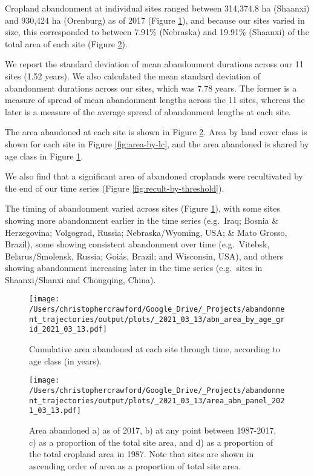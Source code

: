 \documentclass[9pt,twoside,lineno]{pnas-new}
\begin{document}
Cropland abandonment at individual sites ranged between 314,374.8 ha (Shaanxi) and 930,424 ha (Orenburg) as of 2017 (Figure \ref{fig:area-abn-by-age-class}), and because our sites varied in size, this corresponded to between 7.91\% (Nebraska) and 19.91\% (Shaanxi) of the total area of each site (Figure \ref{fig:area-abn-panel}).

We report the standard deviation of mean abandonment durations across our 11 sites (1.52 years).
We also calculated the mean standard deviation of abandonment durations across our sites, which was 7.78 years.
The former is a measure of spread of mean abandonment lengths across the 11 sites, whereas the later is a measure of the average spread of abandonment lengths at each site.

The area abandoned at each site is shown in Figure \ref{fig:area-abn-panel}.
Area by land cover class is shown for each site in Figure \ref{fig:area-by-lc}, and the area abandoned is shared by age class in Figure \ref{fig:area-abn-by-age-class}.

We also find that a significant area of abandoned croplands were recultivated by the end of our time series (Figure \ref{fig:recult-by-threshold}).

The timing of abandonment varied across sites (Figure \ref{fig:area-abn-by-age-class}), with some sites showing more abandonment earlier in the time series (e.g.~Iraq; Bosnia \& Herzegovina; Volgograd, Russia; Nebraska/Wyoming, USA; \& Mato Grosso, Brazil), some showing consistent abandonment over time (e.g.~Vitebsk, Belarus/Smolensk, Russia; Goiás, Brazil; and Wisconsin, USA), and others showing abandonment increasing later in the time series (e.g.~sites in Shaanxi/Shanxi and Chongqing, China).



\begin{figure}
\centering
\texttt{[image: /Users/christophercrawford/Google\_Drive/\_Projects/abandonment\_trajectories/output/plots/\_2021\_03\_13/abn\_area\_by\_age\_grid\_2021\_03\_13.pdf]}
\caption{\label{fig:area-abn-by-age-class}Cumulative area abandoned at each site through time, according to age class (in years).}
\end{figure}



\begin{figure}
\centering
\texttt{[image: /Users/christophercrawford/Google\_Drive/\_Projects/abandonment\_trajectories/output/plots/\_2021\_03\_13/area\_abn\_panel\_2021\_03\_13.pdf]}
\caption{\label{fig:area-abn-panel}Area abandoned a) as of 2017, b) at any point between 1987-2017, c) as a proportion of the total site area, and d) as a proportion of the total cropland area in 1987. Note that sites are shown in ascending order of area as a proportion of total site area.}
\end{figure}
\end{document}
